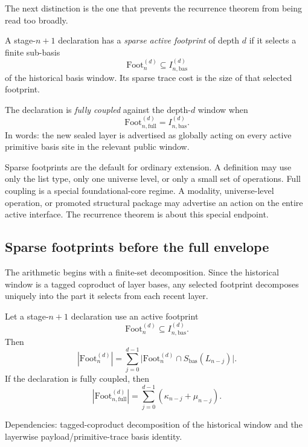 \documentclass{lmcs}
\begin{document}
The next distinction is the one that prevents the recurrence theorem from being read too
broadly.

\begin{defi}
\label{def:sparse-footprint-full-coupling}
A stage-\(n+1\) declaration has a \emph{sparse active footprint} of depth \(d\) if it selects a
finite sub-basis
\[
  \mathrm{Foot}^{(d)}_n \subseteq I^{(d)}_{n,\mathrm{bas}}
\]
of the historical basis window.  Its sparse trace cost is the size of that selected footprint.

The declaration is \emph{fully coupled} against the depth-\(d\) window when
\[
  \mathrm{Foot}^{(d)}_{n,\mathrm{full}} = I^{(d)}_{n,\mathrm{bas}}.
\]
In words: the new sealed layer is advertised as globally acting on every active primitive basis
site in the relevant public window.
\end{defi}

Sparse footprints are the default for ordinary extension.  A definition may use only the
list type, only one universe level, or only a small set of operations.  Full coupling is a
special foundational-core regime.  A modality, universe-level operation, or promoted structural
package may advertise an action on the entire active interface.  The recurrence theorem is
about this special endpoint.

\subsection{Sparse footprints before the full envelope}
\label{subsec:sparse-footprints}

The arithmetic begins with a finite-set decomposition.  Since the historical window is a
tagged coproduct of layer bases, any selected footprint decomposes uniquely into the part it
selects from each recent layer.

\begin{lem}
\label{lem:window-cardinality}
Let a stage-\(n+1\) declaration use an active footprint
\[
  \mathrm{Foot}^{(d)}_n \subseteq I^{(d)}_{n,\mathrm{bas}}.
\]
Then
\[
  |\mathrm{Foot}^{(d)}_n|
  =
  \sum_{j=0}^{d-1}
  \bigl|\mathrm{Foot}^{(d)}_n \cap S_{\mathrm{bas}}(L_{n-j})\bigr|.
\]
If the declaration is fully coupled, then
\[
  |\mathrm{Foot}^{(d)}_{n,\mathrm{full}}|
  =
  \sum_{j=0}^{d-1}
  (\kappa_{n-j}+\mu_{n-j}).
\]

Dependencies: tagged-coproduct decomposition of the historical window and the layerwise
payload/primitive-trace basis identity.
\end{lem}
\end{document}
